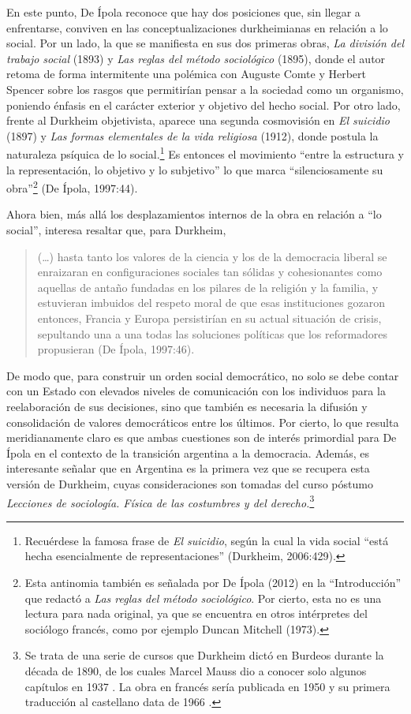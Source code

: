 En este punto, De Ípola reconoce que hay dos posiciones que, sin llegar a enfrentarse, conviven en las conceptualizaciones durkheimianas en relación a lo social. Por un lado, la que se manifiesta en sus dos primeras obras, \emph{La división del trabajo social} (1893) y \emph{Las reglas del método sociológico} (1895), donde el autor retoma de forma intermitente una polémica con Auguste Comte y Herbert Spencer sobre los rasgos que permitirían pensar a la sociedad como un organismo, poniendo énfasis en el carácter exterior y objetivo del hecho social. Por otro lado, frente al Durkheim objetivista, aparece una segunda cosmovisión en \emph{El suicidio} (1897) y \emph{Las formas elementales de la vida religiosa} (1912), donde postula la naturaleza psíquica de lo social.\footnote{Recuérdese la famosa frase de \emph{El suicidio}, según la cual la vida social \enquote{está hecha esencialmente de representaciones} (Durkheim, 2006:429).} Es entonces el movimiento \enquote{entre la estructura y la representación, lo objetivo y lo subjetivo} lo que marca \enquote{silenciosamente su obra}\footnote{Esta antinomia también es señalada por De Ípola (2012) en la \enquote{Introducción} que redactó a \emph{Las reglas del método sociológico}. Por cierto, esta no es una lectura para nada original, ya que se encuentra en otros intérpretes del sociólogo francés, como por ejemplo Duncan Mitchell (1973).} (De Ípola, 1997:44).

Ahora bien, más allá los desplazamientos internos de la obra en relación a \enquote{lo social}, interesa resaltar que, para Durkheim,

\begin{quote}
(\dots) hasta tanto los valores de la ciencia y los de la democracia liberal se enraizaran en configuraciones sociales tan sólidas y cohesionantes como aquellas de antaño fundadas en los pilares de la religión y la familia, y estuvieran imbuidos del respeto moral de que esas instituciones gozaron entonces, Francia y Europa persistirían en su actual situación de crisis, sepultando una a una todas las soluciones políticas que los reformadores propusieran (De Ípola, 1997:46).
\end{quote}

De modo que, para construir un orden social democrático, no solo se debe contar con un Estado con elevados niveles de comunicación con los individuos para la reelaboración de sus decisiones, sino que también es necesaria la difusión y consolidación de valores democráticos entre los últimos. Por cierto, lo que resulta meridianamente claro es que ambas cuestiones son de interés primordial para De Ípola en el contexto de la transición argentina a la democracia. Además, es interesante señalar que en Argentina es la primera vez que se recupera esta versión de Durkheim, cuyas consideraciones son tomadas del curso póstumo \emph{Lecciones de sociología. Física de las costumbres y del derecho.}\footnote{Se trata de una serie de cursos que Durkheim dictó en Burdeos durante la década de 1890, de los cuales Marcel Mauss dio a conocer solo algunos capítulos en 1937 \parencite{1443-BOUGLE1938}. La obra en francés sería publicada en 1950 y su primera traducción al castellano data de 1966 \parencite{1449-CATANO1998}.}

